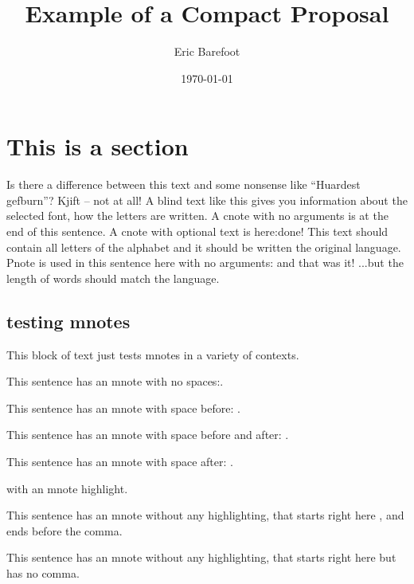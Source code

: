 \documentclass[final]{compact_proposal}
\title{Example of a Compact Proposal}
\author{Eric Barefoot}
\date{\today}
\begin{document}
\maketitle

\section{This is a section}
Is there a difference between this text and some nonsense like ``Huardest gefburn''? Kjift – not at all!
A blind text like this gives you information about the  selected font, how the letters are written. A cnote with no arguments is at the end of this sentence\cnote.
A cnote with optional text is here: done!
This text should contain all letters of the alphabet and it should be written  the original language.
Pnote is used in this sentence here with no arguments: \pnote and that was it! ...but the length of words  should match the language.



\subsection{testing mnotes}

This block of text just tests mnotes in a variety of contexts.

This sentence has an mnote with no spaces:.

This sentence has an mnote with space before: .

This sentence has an mnote with space before and after:  .

This sentence has an mnote with space after: .

 with an mnote highlight.

This sentence has an mnote without any highlighting, that starts right here , and ends before the comma. 

This sentence has an mnote without any highlighting, that starts right here  but has no comma. 
\end{document}

